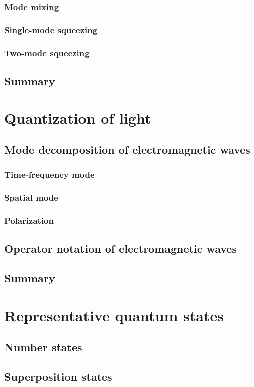 \documentclass{book}
\begin{document}
\subsection{Mode mixing}
\subsection{Single-mode squeezing}
\subsection{Two-mode squeezing}
\section{Summary}

\chapter{Quantization of light}
\section{Mode decomposition of electromagnetic waves}
\subsection{Time-frequency mode}
\subsection{Spatial mode}
\subsection{Polarization}
\section{Operator notation of electromagnetic waves}
\section{Summary}

\chapter{Representative quantum states}
\section{Number states}
\section{Superposition states}
\end{document}
